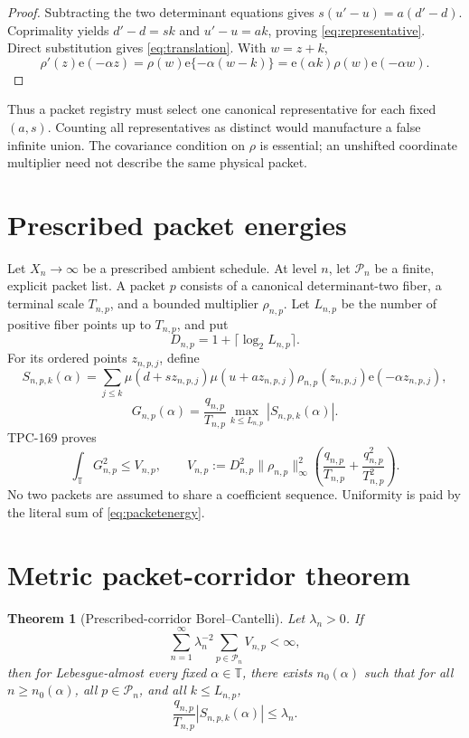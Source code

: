 \documentclass[11pt]{article}
\newtheorem{theorem}{Theorem}[section]
\theoremstyle{definition}
\newcommand{\e}{\mathrm e}
\newcommand{\T}{\mathbb T}
\newcommand{\norm}[1]{\lVert#1\rVert}
\begin{document}
\begin{proof}
Subtracting the two determinant equations gives
\(s(u'-u)=a(d'-d)\).  Coprimality yields
\(d'-d=sk\) and \(u'-u=ak\), proving
\eqref{eq:representative}.  Direct substitution gives
\eqref{eq:translation}.  With \(w=z+k\),
\[
 \rho'(z)\e(-\alpha z)
 =\rho(w)\e\{-\alpha(w-k)\}
 =\e(\alpha k)\rho(w)\e(-\alpha w).
\]
\end{proof}

Thus a packet registry must select one canonical representative for
each fixed \((a,s)\).  Counting all representatives as distinct
would manufacture a false infinite union.  The covariance condition
on \(\rho\) is essential; an unshifted coordinate multiplier need
not describe the same physical packet.

\section{Prescribed packet energies}

Let \(X_n\to\infty\) be a prescribed ambient schedule.  At level
\(n\), let \(\mathcal P_n\) be a finite, explicit packet list.  A
packet \(p\) consists of a canonical determinant-two fiber, a
terminal scale \(T_{n,p}\), and a bounded multiplier
\(\rho_{n,p}\).  Let \(L_{n,p}\) be the number of positive fiber
points up to \(T_{n,p}\), and put
\[
 D_{n,p}=1+\lceil\log_2L_{n,p}\rceil.
\]
For its ordered points \(z_{n,p,j}\), define
\[
 S_{n,p,k}(\alpha)=
 \sum_{j\le k}
 \mu(d+sz_{n,p,j})\mu(u+az_{n,p,j})
 \rho_{n,p}(z_{n,p,j})\e(-\alpha z_{n,p,j}),
\]
\[
 G_{n,p}(\alpha)=
 \frac{q_{n,p}}{T_{n,p}}
 \max_{k\le L_{n,p}}|S_{n,p,k}(\alpha)|.
\]
TPC-169 proves \citep{WangTPC169}
\begin{equation}
 \int_{\T}G_{n,p}^2
 \le V_{n,p},
\qquad
 V_{n,p}:=
 D_{n,p}^2\norm{\rho_{n,p}}_\infty^2
 \left(
 \frac{q_{n,p}}{T_{n,p}}
 +\frac{q_{n,p}^2}{T_{n,p}^2}
 \right).
\label{eq:packetenergy}
\end{equation}
No two packets are assumed to share a coefficient sequence.
Uniformity is paid by the literal sum of \eqref{eq:packetenergy}.

\section{Metric packet-corridor theorem}

\begin{theorem}[Prescribed-corridor Borel--Cantelli]\label{thm:bc}
Let \(\lambda_n>0\).  If
\begin{equation}
 \sum_{n=1}^{\infty}
 \lambda_n^{-2}
 \sum_{p\in\mathcal P_n}V_{n,p}<\infty,
\label{eq:summability}
\end{equation}
then for Lebesgue-almost every fixed \(\alpha\in\T\), there exists
\(n_0(\alpha)\) such that for all \(n\ge n_0(\alpha)\), all
\(p\in\mathcal P_n\), and all \(k\le L_{n,p}\),
\begin{equation}
 \frac{q_{n,p}}{T_{n,p}}
 |S_{n,p,k}(\alpha)|
 \le\lambda_n.
\label{eq:eventual}
\end{equation}
\end{theorem}
\end{document}
